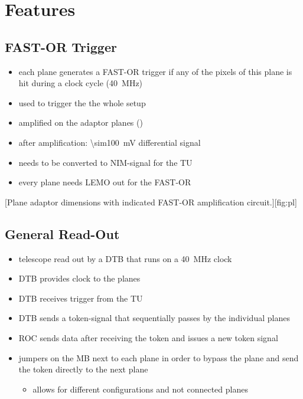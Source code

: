 \section{Features}
\subsection{FAST-OR Trigger}
\begin{itemize}
	\item each plane generates a FAST-OR trigger if any of the pixels of this plane is hit during a clock cycle (\SI{40}{\MHz})
	\item used to trigger the the whole setup
	\item amplified on the adaptor planes ()
	\item after amplification: \SI{\sim100}{\mV} differential signal
	\item needs to be converted to NIM-signal for the \ac{TU}
	\item every plane needs LEMO out for the FAST-OR
\end{itemize}
[Plane adaptor dimensions with indicated FAST-OR amplification circuit.][fig:pl]

\subsection{General Read-Out}
\begin{itemize}
	\item telescope read out by a \ac{DTB} that runs on a \SI{40}{\MHz} clock
	\item \ac{DTB} provides clock to the planes
	\item \ac{DTB} receives trigger from the \ac{TU}
	\item \ac{DTB} sends a token-signal that  sequentially passes by the individual planes
	\item \ac{ROC} sends data after receiving the token and issues a new token signal
	\item jumpers on the \ac{MB} next to each plane in order to bypass the plane and send the token directly to the next plane
	\begin{itemize}
	\item[\ra] allows for different configurations and not connected planes
	\end{itemize}

\end{itemize}





